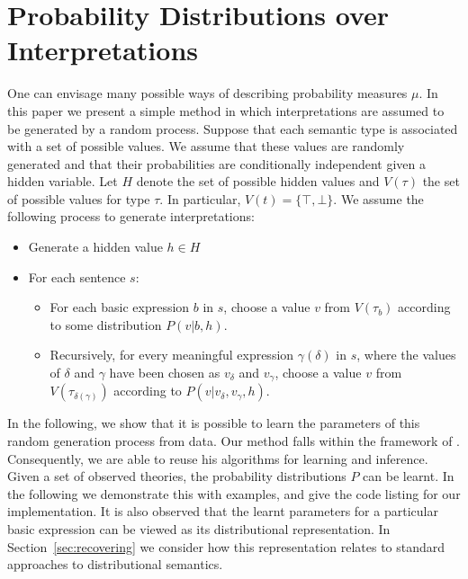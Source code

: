\documentclass[letterpaper]{article}
\newcommand{\citet}[1]{\newcite{#1}}
\begin{document}

\section{Probability Distributions over Interpretations}

One can envisage many possible ways of describing probability measures
$\mu$. In this paper we present a simple method in which
interpretations are assumed to be generated by a random process. Suppose that each semantic type is associated with a set of possible values. 
We assume that these values are randomly generated and that their
probabilities are conditionally independent given a hidden
variable. Let $H$ denote the set of possible hidden values and $V(\tau)$  the
set of possible values for type $\tau$. In particular, $V(t) = \{\top, \bot\}$. We assume the following process to generate
interpretations:
\begin{itemize}
\item Generate a hidden value $h\in H$
\item For each sentence $s$:
\begin{itemize}
\item For each basic expression $b$ in $s$, choose a value $v$ from
  $V(\tau_b)$ according to some distribution $P(v|b,h)$.
\item Recursively, for every meaningful expression $\gamma(\delta)$ in
  $s$, where the values of $\delta$ and $\gamma$ have been chosen as
  $v_\delta$ and $v_\gamma$, choose a value $v$ from
  $V(\tau_{\delta(\gamma)})$ according to $P(v|v_\delta, v_\gamma,
  h)$.
\end{itemize}
\end{itemize}

In the following, we show that it is possible to learn the parameters
of this random generation process from data.  Our method falls within
the framework of \citet{Sato:95}. Consequently, we are able to reuse his
algorithms for learning and inference.  Given a set of observed
theories, the probability distributions $P$ can be learnt. In the
following we demonstrate this with examples, and give the code listing
for our implementation. It is also observed that the learnt parameters for a particular basic expression can
be viewed as its distributional representation. In
Section~\ref{sec:recovering} we consider how this representation
relates to standard approaches to distributional semantics.
\end{document}
